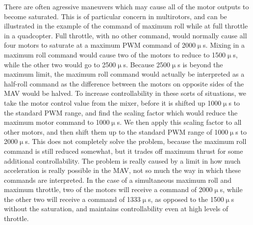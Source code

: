 \documentclass[paper=a4, fontsize=11pt]{scrartcl} %
\begin{document}
There are often agressive maneuvers which may cause all of the motor outputs to become saturated.  This is of particular concern in multirotors, and can be illustrated in the example of the command of maximum roll while at full throttle in a quadcopter.  Full throttle, with no other command, would normally cause all four motors to saturate at a maximum PWM command of 2000$\upmu$s.  Mixing in a maximum roll command would cause two of the motors to reduce to 1500$\upmu$s, while the other two would go to 2500$\upmu$s.  Because 2500$\upmu$s is beyond the maximum limit, the maximum roll command would actually be interpreted as a half-roll command as the difference between the motors on opposite sides of the MAV would be halved.  To increase controllability in these sorts of situations, we take the motor control value from the mixer, before it is shifted up 1000$\upmu$s to the standard PWM range, and find the scaling factor which would reduce the maximum motor command to 1000$\upmu$s.  We then apply this scaling factor to all other motors, and then shift them up to the standard PWM range of 1000$\upmu$s to 2000$\upmu$s.  This does not completely solve the problem, because the maximum roll command is still reduced somewhat, but it trades off maximum thrust for some additional controllability.  The problem is really caused by a limit in how much acceleration is really possible in the MAV, not so much the way in which these commands are interpreted.  In the case of a simultaneous maximum roll and maximum throttle, two of the motors will receive a command of 2000$\upmu$s, while the other two will receive a command of 1333$\upmu$s, as opposed to the 1500$\upmu$s without the saturation, and maintains controllability even at high levels of throttle.
\end{document}
